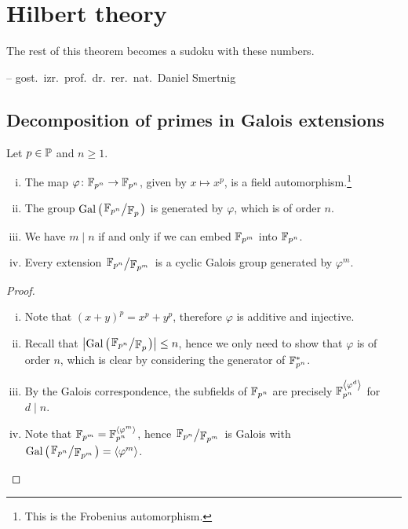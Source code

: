 \section{Hilbert theory}

\epigraph{The rest of this theorem becomes a sudoku with these
numbers.}
{-- gost.~izr.~prof.~dr.~rer.~nat.~Daniel Smertnig}

\subsection{Decomposition of primes in Galois extensions}

\begin{trditev}
Let $p \in \P$ and $n \geq 1$.

\begin{enumerate}[i)]
\item The map $\varphi \colon \F_{p^n} \to \F_{p^n}$, given by
$x \mapsto x^p$, is a field automorphism.\footnote{This is the
Frobenius automorphism.}
\item The group $\Gal \br{\kvoc{\F_{p^n}}{\F_p}}$ is generated by
$\varphi$, which is of order $n$.
\item We have $m \mid n$ if and only if we can embed $\F_{p^m}$
into $\F_{p^n}$.
\item Every extension $\kvoc{\F_{p^n}}{\F_{p^m}}$ is a cyclic
Galois group generated by $\varphi^m$.
\end{enumerate}
\end{trditev}

\begin{proof}
\phantom{i}
\begin{enumerate}[i)]
\item Note that $(x+y)^p = x^p + y^p$, therefore $\varphi$ is
additive and injective.
\item Recall that $\abs{\Gal \br{\kvoc{\F_{p^n}}{\F_p}}} \leq n$,
hence we only need to show that $\varphi$ is of order $n$, which is
clear by considering the generator of $\F_{p^n}^*$.
\item By the Galois correspondence, the subfields of $\F_{p^n}$ are
precisely $\F_{p^n}^{\skl{\varphi^d}}$ for $d \mid n$.
\item Note that $\F_{p^m} = \F_{p^n}^{\skl{\varphi^m}}$, hence
$\kvoc{\F_{p^n}}{\F_{p^m}}$ is Galois with
$\Gal \br{\kvoc{\F_{p^n}}{\F_{p^m}}} = \skl{\varphi^m}$. \qedhere
\end{enumerate}
\end{proof}

